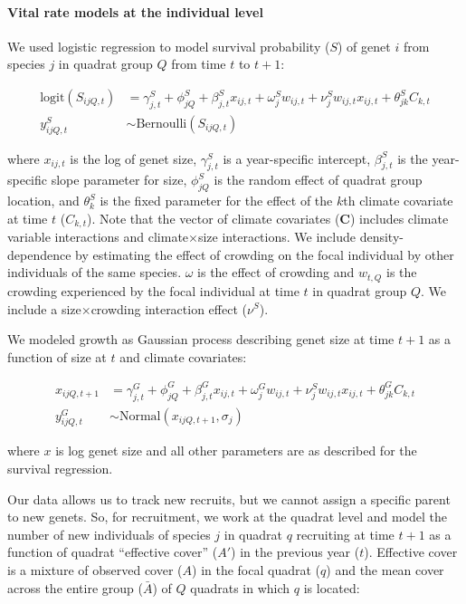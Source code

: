 \documentclass[12pt,]{article}
\begin{document}
\paragraph{Vital rate models at the individual
level}\label{vital-rate-models-at-the-individual-level}

We used logistic regression to model survival probability ($S$) of genet
$i$ from species $j$ in quadrat group $Q$ from time $t$ to $t+1$:

\begin{align}
\text{logit}(S_{ijQ,t}) &= \gamma^{S}_{j,t} + \phi^{S}_{jQ} + \beta^{S}_{j,t}x_{ij,t} + \omega^{S}_{j}w_{ij,t} + \nu^{S}_{j}w_{ij,t}x_{ij,t} + \theta^{S}_{jk}C_{k,t} \\
y^{S}_{ijQ,t} &\sim \text{Bernoulli}(S_{ijQ,t})
\end{align}

where $x_{ij,t}$ is the log of genet size, $\gamma^{S}_{j,t}$ is a
year-specific intercept, $\beta^{S}_{j,t}$ is the year-specific slope
parameter for size, $\phi^{S}_{jQ}$ is the random effect of quadrat
group location, and $\theta^{S}_{k}$ is the fixed parameter for the
effect of the $k$th climate covariate at time $t$ ($C_{k,t}$). Note that
the vector of climate covariates (\textbf{C}) includes climate variable
interactions and climate$\times$size interactions. We include
density-dependence by estimating the effect of crowding on the focal
individual by other individuals of the same species. $\omega$ is the
effect of crowding and $w_{t,Q}$ is the crowding experienced by the
focal individual at time $t$ in quadrat group $Q$. We include a
size$\times$crowding interaction effect ($\nu^{S}$).

We modeled growth as Gaussian process describing genet size at time
$t+1$ as a function of size at $t$ and climate covariates:

\begin{align}
x_{ijQ,t+1} &= \gamma^{G}_{j,t} + \phi^{G}_{jQ} + \beta^{G}_{j,t}x_{ij,t} + \omega^{G}_{j}w_{ij,t} + \nu^{S}_{j}w_{ij,t}x_{ij,t} + \theta^{G}_{jk}C_{k,t} \\
y^{G}_{ijQ,t} &\sim \text{Normal}(x_{ijQ,t+1}, \sigma_{j})
\end{align}

where $x$ is log genet size and all other parameters are as described
for the survival regression.

Our data allows us to track new recruits, but we cannot assign a
specific parent to new genets. So, for recruitment, we work at the
quadrat level and model the number of new individuals of species $j$ in
quadrat $q$ recruiting at time $t+1$ as a function of quadrat
``effective cover'' ($A'$) in the previous year ($t$). Effective cover
is a mixture of observed cover ($A$) in the focal quadrat ($q$) and the
mean cover across the entire group ($\bar{A}$) of $Q$ quadrats in which
$q$ is located:
\end{document}
